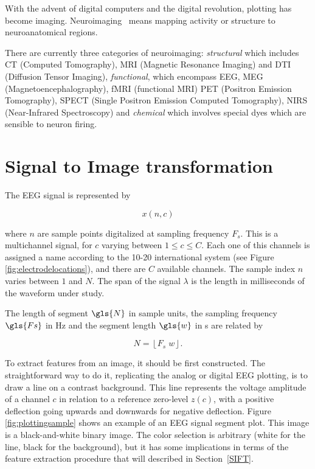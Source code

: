 
\begin{story}[Neuroimaging]
With the advent of digital computers and the digital revolution, plotting has become imaging.  Neuroimaging~\cite{Freeman2013} means mapping activity or structure to neuroanatomical regions.

There are currently three categories of neuroimaging: \textit{structural} which includes CT (Computed Tomography), MRI (Magnetic Resonance Imaging) and DTI (Diffusion Tensor Imaging), \textit{functional}, which encompass EEG, MEG (Magnetoencephalography), fMRI (functional MRI) PET (Positron Emission Tomography), SPECT (Single Positron Emission Computed Tomography), NIRS (Near-Infrared Spectroscopy) and \textit{chemical} which involves special dyes which are sensible to neuron firing.
\end{story}

\section{Signal to Image transformation}

The EEG signal is represented by

\begin{equation}
x(n,c)
\label{eq:zerolevel}
\end{equation}

\noindent where $n$ are sample points digitalized at sampling frequency $F_s$.  This is a multichannel signal, for $c$ varying between  $1 \leq c \leq C$.  Each one of this channels is assigned a name according to the 10-20 international system (see Figure \ref{fig:electrodelocations}), and there are $C$ available channels. The sample index $n$ varies between $1$ and $N$.  The span of the signal $\lambda$ is the length in milliseconds of the waveform under study. 

The length of segment $\gls{N}$ in sample units, the sampling frequency $\gls{Fs}$ in \si{\hertz} and the segment length $\gls{w}$ in \si{\second} are related by

\begin{equation}
N = \left\lfloor F_s \; w \right\rfloor.
\label{eq:segmentlength}
\end{equation}

\vspace{3pt}

To extract features from an image, it should be first constructed.  The straightforward way to do it, replicating the analog or digital EEG plotting, is to draw a line on a contrast background.  This line represents the voltage amplitude of a channel $c$ in relation to a reference zero-level $z(c)$, with a positive deflection going upwards and downwards for negative deflection.  Figure \ref{fig:plottingsample} shows an example of an EEG signal segment plot.  This image is a black-and-white binary image.  The color selection is arbitrary (white for the line, black for the background), but it has some implications in terms of the feature extraction procedure that will described in Section~\ref{SIFT}.

